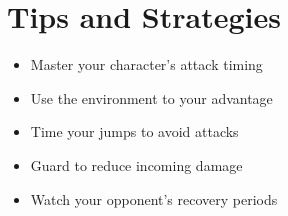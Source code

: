 \documentclass[10pt,twocolumn]{article}
\begin{document}
\section{Tips and Strategies}
\begin{itemize}
\item Master your character's attack timing
\item Use the environment to your advantage
\item Time your jumps to avoid attacks
\item Guard to reduce incoming damage
\item Watch your opponent's recovery periods
\end{itemize}
\end{document}
